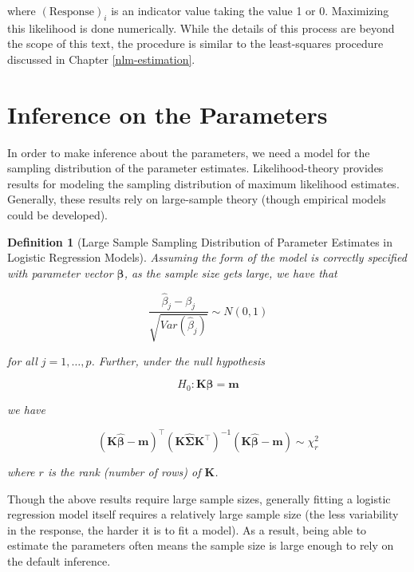 \documentclass[
]{book}
\theoremstyle{plain}
\theoremstyle{mydefn}
\newtheorem{definition}{Definition}[chapter]
\theoremstyle{myexmpl}
\theoremstyle{remark}
\begin{document}
where \((\text{Response})_i\) is an indicator value taking the value 1 or 0. Maximizing this likelihood is done numerically. While the details of this process are beyond the scope of this text, the procedure is similar to the least-squares procedure discussed in Chapter \ref{nlm-estimation}.

\hypertarget{inference-on-the-parameters-1}{%
\section{Inference on the Parameters}\label{inference-on-the-parameters-1}}

In order to make inference about the parameters, we need a model for the sampling distribution of the parameter estimates. Likelihood-theory provides results for modeling the sampling distribution of maximum likelihood estimates. Generally, these results rely on large-sample theory (though empirical models could be developed).

\begin{definition}[Large Sample Sampling Distribution of Parameter Estimates in Logistic Regression Models]
Assuming the form of the model is correctly specified with parameter vector \(\boldsymbol{\beta}\), as the sample size gets large, we have that

\[\frac{\widehat{\beta}_j - \beta_j}{\sqrt{Var\left(\widehat{\beta}_j\right)}} \sim N(0, 1)\]

for all \(j = 1, \dotsc, p\). Further, under the null hypothesis

\[H_0: \mathbf{K}\boldsymbol{\beta} = \mathbf{m}\]

we have

\[\left(\mathbf{K}\widehat{\boldsymbol{\beta}} - \mathbf{m}\right)^\top \left(\mathbf{K}\widehat{\boldsymbol{\Sigma}}\mathbf{K}^\top\right)^{-1} \left(\mathbf{K}\widehat{\boldsymbol{\beta}} - \mathbf{m}\right) \sim \chi^2_r\]

where \(r\) is the rank (number of rows) of \(\mathbf{K}\).
\end{definition}

\begin{rmdtip}
Though the above results require large sample sizes, generally fitting a logistic regression model itself requires a relatively large sample size (the less variability in the response, the harder it is to fit a model). As a result, being able to estimate the parameters often means the sample size is large enough to rely on the default inference.
\end{rmdtip}
\end{document}
